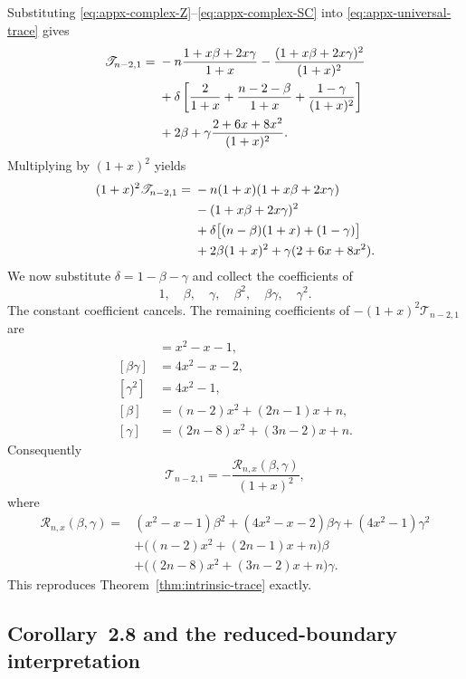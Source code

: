\documentclass[11pt,reqno]{amsart}
\numberwithin{equation}{section}
\theoremstyle{definition}
\theoremstyle{remark}
\begin{document}
Substituting \eqref{eq:appx-complex-Z}--\eqref{eq:appx-complex-SC} into
\eqref{eq:appx-universal-trace} gives
\begin{align}
\mathscr T_{n-2,1}
={}&-n\frac{1+x\beta+2x\gamma}{1+x}
-\frac{(1+x\beta+2x\gamma)^2}{(1+x)^2}\notag\\
&+\delta\left[
\frac{2}{1+x}
+\frac{n-2-\beta}{1+x}
+\frac{1-\gamma}{(1+x)^2}
\right]\notag\\
&+2\beta
+\gamma\frac{2+6x+8x^2}{(1+x)^2}.
\label{eq:appx-complex-before-clear}
\end{align}
Multiplying by $(1+x)^2$ yields
\begin{align}
(1+x)^2\mathscr T_{n-2,1}
={}&-n(1+x)(1+x\beta+2x\gamma)\notag\\
&-(1+x\beta+2x\gamma)^2\notag\\
&+\delta\big[(n-\beta)(1+x)+(1-\gamma)\big]\notag\\
&+2\beta(1+x)^2+\gamma(2+6x+8x^2).
\label{eq:appx-complex-cleared}
\end{align}
We now substitute $\delta=1-\beta-\gamma$ and collect the coefficients of
\[
1,\quad \beta,\quad\gamma,\quad\beta^2,\quad\beta\gamma,\quad\gamma^2.
\]
The constant coefficient cancels.  The remaining coefficients of
$-(1+x)^2\mathscr T_{n-2,1}$ are
\begin{align*}
[\beta^2]&=x^2-x-1,\\
[\beta\gamma]&=4x^2-x-2,\\
[\gamma^2]&=4x^2-1,\\
[\beta]&=(n-2)x^2+(2n-1)x+n,\\
[\gamma]&=(2n-8)x^2+(3n-2)x+n.
\end{align*}
Consequently
\begin{equation}
\mathscr T_{n-2,1}
=-\frac{\mathcal R_{n,x}(\beta,\gamma)}{(1+x)^2},
\label{eq:appx-complex-final}
\end{equation}
where
\begin{equation}
\begin{aligned}
\mathcal R_{n,x}(\beta,\gamma)
={}&(x^2-x-1)\beta^2
 +(4x^2-x-2)\beta\gamma
 +(4x^2-1)\gamma^2\\
&+\bigl((n-2)x^2+(2n-1)x+n\bigr)\beta\\
&+\bigl((2n-8)x^2+(3n-2)x+n\bigr)\gamma.
\end{aligned}
\label{eq:appx-complex-R}
\end{equation}
This reproduces Theorem~\ref{thm:intrinsic-trace} exactly.

\subsection{Corollary~2.8 and the reduced-boundary interpretation}
\end{document}

